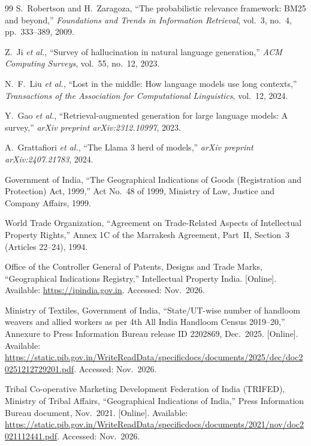 \begin{thebibliography}{99}
 S.~Robertson and H.~Zaragoza, ``The probabilistic relevance framework:
BM25 and beyond,'' \emph{Foundations and Trends in Information Retrieval}, vol.~3, no.~4,
pp.~333--389, 2009.

 Z.~Ji \emph{et al.}, ``Survey of hallucination in natural language
generation,'' \emph{ACM Computing Surveys}, vol.~55, no.~12, 2023.

 N.~F.~Liu \emph{et al.}, ``Lost in the middle: How language models use long
contexts,'' \emph{Transactions of the Association for Computational Linguistics}, vol.~12, 2024.

 Y.~Gao \emph{et al.}, ``Retrieval-augmented generation for large language
models: A survey,'' \emph{arXiv preprint arXiv:2312.10997}, 2023.

 A.~Grattafiori \emph{et al.}, ``The Llama 3 herd of models,'' \emph{arXiv preprint
arXiv:2407.21783}, 2024.

 Government of India, ``The Geographical Indications of Goods (Registration and
Protection) Act, 1999,'' Act No.~48 of 1999, Ministry of Law, Justice and Company Affairs, 1999.

 World Trade Organization, ``Agreement on Trade-Related Aspects of Intellectual
Property Rights,'' Annex 1C of the Marrakesh Agreement, Part~II, Section~3 (Articles 22--24), 1994.

 Office of the Controller General of Patents, Designs and Trade Marks,
``Geographical Indications Registry,'' Intellectual Property India. [Online]. Available:
\url{https://ipindia.gov.in}. Accessed: Nov.~2026.

 Ministry of Textiles, Government of India, ``State/UT-wise number of handloom
weavers and allied workers as per 4th All India Handloom Census 2019--20,'' Annexure to Press
Information Bureau release ID 2202869, Dec.~2025. [Online]. Available:
\url{https://static.pib.gov.in/WriteReadData/specificdocs/documents/2025/dec/doc20251212729201.pdf}.
Accessed: Nov.~2026.

 Tribal Co-operative Marketing Development Federation of India (TRIFED), Ministry of
Tribal Affairs, ``Geographical Indications of India,'' Press Information Bureau document, Nov.~2021.
[Online]. Available:
\url{https://static.pib.gov.in/WriteReadData/specificdocs/documents/2021/nov/doc2021112441.pdf}.
Accessed: Nov.~2026.


\end{thebibliography}
